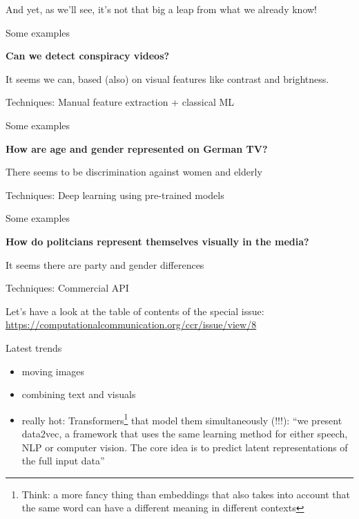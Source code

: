 \begin{frame}[standout]
And yet, as we'll see, it's not that big a leap from what we already know!
\end{frame}


\begin{frame}{Some examples}
  \begin{block}{\cite{Chen2022}}
    \textbf{Can we detect conspiracy videos?}

    It seems we can, based (also) on visual features like contrast and brightness.

    Techniques: Manual feature extraction + classical ML
  \end{block}
\end{frame}


\begin{frame}{Some examples}
  \begin{block}{\cite{Jurgens2022}}
    \textbf{How are age and gender represented on German TV?}

    There seems to be discrimination against women and elderly

    Techniques: Deep learning using pre-trained models
  \end{block}
\end{frame}



\begin{frame}{Some examples}
  \begin{block}{\cite{Joo2022}}
    \textbf{How do politcians represent themselves visually in the media?}

    It seems there are party and gender differences
    
    Techniques: Commercial API
  \end{block}
\end{frame}


\begin{frame}[standout]
  Let's have a look at the table of contents of the special issue:
  \url{https://computationalcommunication.org/ccr/issue/view/8}
\end{frame}

\begin{frame}{Latest trends}
  \begin{itemize}
  \item moving images
  \item combining text and visuals
  \item really hot: Transformers\footnote{Think: a more fancy thing than embeddings that also takes into account that the same word can have a different meaning in different contexts} that model them simultaneously (!!!): ``we present data2vec, a framework that uses the same learning method for either speech, NLP or computer vision. The core idea is to predict latent representations of the full input data'' \parencite{Baevski2022}
  \end{itemize}

\end{frame}



